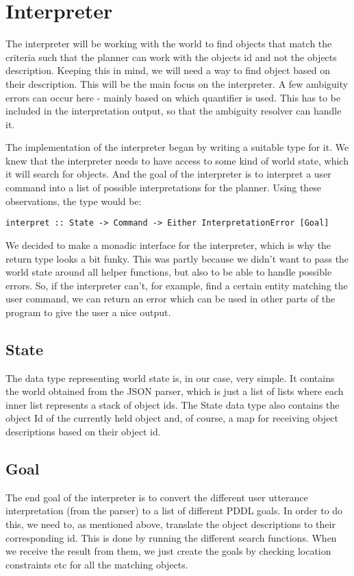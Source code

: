 \section*{Interpreter}
The interpreter will be working with the world to find objects that match the criteria such that the planner can work with the objects id and not the objects description. Keeping this in mind, we will need a way to find object based on their description. This will be the main focus on the interpreter. A few ambiguity errors can occur here - mainly based on which quantifier is used. This has to be included in the interpretation output, so that the ambiguity resolver can handle it.

The implementation of the interpreter began by writing a suitable type for it.
We knew that the interpreter needs to have access to some kind of world state, which it will search for objects.
And the goal of the interpreter is to interpret a user command into a list of possible interpretations for the planner.
Using these observations, the type would be:

\begin{lstlisting}
interpret :: State -> Command -> Either InterpretationError [Goal]
\end{lstlisting}

We decided to make a monadic interface for the interpreter, which is why the return type looks a bit funky. This was partly because we didn't want to pass the world state around all helper functions, but also to be able to handle possible errors.
So, if the interpreter can't, for example, find a certain entity matching the user command, we can return an error which can be used in other parts of the program to give the user a nice output.

\subsection*{State}
The data type representing world state is, in our case, very simple.
It contains the world obtained from the JSON parser, which is just a list of lists where each inner list represents a stack of object ids.
The State data type also contains the object Id of the currently held object and, of course, a map for receiving object descriptions based on their object id.

\subsection*{Goal}
The end goal of the interpreter is to convert the different user utterance interpretation (from the parser) to a list of different PDDL goals. In order to do this, we need to, as mentioned above, translate the object descriptions to their corresponding id. This is done by running the different search functions. When we receive the result from them, we just create the goals by checking location constraints etc for all the matching objects.

